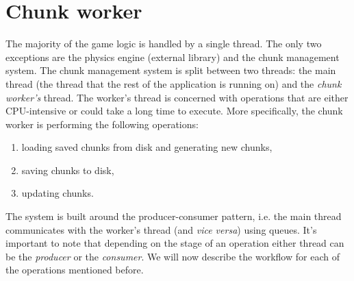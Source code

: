 \section{Chunk worker}
The majority of the game logic is handled by a single thread.
The only two exceptions are the physics engine (external library) and the chunk management system.
The chunk management system is split between two threads: the main thread (the thread that the rest of the application is running on) and the \textit{chunk worker's} thread.
The worker's thread is concerned with operations that are either CPU-intensive or could take a long time to execute.
More specifically, the chunk worker is performing the following operations:
\begin{enumerate}
    \item loading saved chunks from disk and generating new chunks,
    \item saving chunks to disk,
    \item updating chunks.
\end{enumerate}
The system is built around the producer-consumer pattern, i.e. the main thread communicates with the worker's thread (and \textit{vice versa}) using queues.
It's important to note that depending on the stage of an operation either thread can be the \textit{producer} or the \textit{consumer}.
We will now describe the workflow for each of the operations mentioned before.



